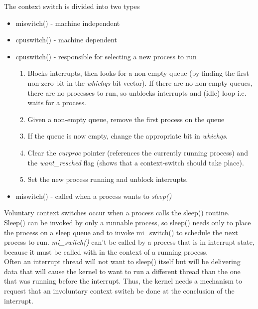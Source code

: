 \documentclass[11pt]{article}
\begin{document}
The context switch is divided into two types\\
\begin{itemize}
\item miswitch()  - machine independent\\
\item cpuswitch() - machine dependent\\

\item cpuswitch() - responsible for selecting a new process to run\\
\begin{enumerate}
\item Blocks interrupts, then looks for a non-empty queue (by finding the first non-zero bit in the \emph{whichqs} bit vector). If there are no non-empty queues, there are no processes to run, so unblocks interrupts and (idle) loop i.e. waits for a process.\\
\item Given a non-empty queue, remove the first process on the queue\\
\item If the queue is now empty, change the appropriate bit in \emph{whichqs}.\\
\item Clear the \emph{curproc} pointer (references the currently running process) and the \emph{want\_resched} flag (shows that a context-switch should take place).\\
\item Set the new process running and unblock interrupts.\\
\end{enumerate}

\item miswitch() - called when a process wants to \emph{sleep()}\\
\end{itemize}

Voluntary context switches occur when a process calls the sleep() routine.\\
Sleep() can be invoked by only a runnable process, so sleep() needs only to place the process on a sleep queue and to invoke mi\_switch() to schedule the next process to run. \emph{mi\_switch()} can’t be called by a process that is in interrupt state, because it must be called with in the context of a running process.\\

Often an interrupt thread will not want to sleep() itself but will be delivering data that will cause the kernel to want to run a different thread than the one that was running before the interrupt. Thus, the kernel needs a mechanism to request that an involuntary context switch be done at the conclusion of the interrupt.\\
\end{document}
